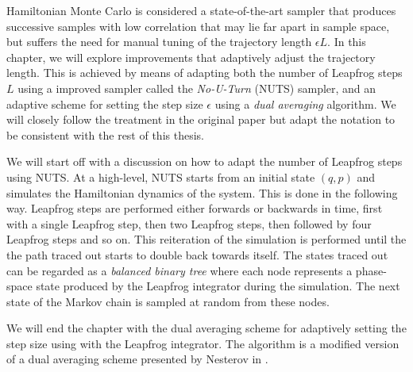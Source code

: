 Hamiltonian Monte Carlo is considered a state-of-the-art sampler that produces successive samples with low correlation
that may lie far apart in sample space, 
but suffers the need for manual tuning of the trajectory length $\epsilon L$. 
In this chapter, we will explore improvements that adaptively adjust the trajectory length. This is achieved by means of adapting both the number of Leapfrog steps $L$ using a improved sampler called the \textit{No-U-Turn} (NUTS) sampler, and an adaptive scheme for setting the step size $\epsilon$ using a \textit{dual averaging} algorithm. We will closely follow the treatment in the original paper \cite{nuts} but adapt the notation to be consistent with the rest of this thesis.

We will start off with a discussion on how to adapt the number of Leapfrog steps using NUTS. At a high-level, NUTS starts from an initial state $(q, p)$ and simulates the Hamiltonian dynamics of the system. This is
done in the following way. Leapfrog steps are performed either forwards or backwards in time, first with a single Leapfrog step, then two Leapfrog steps, then followed by four Leapfrog steps and so on. This reiteration of the simulation is performed until the the path traced out starts to double back towards itself. The states traced out can be regarded as a \textit{balanced binary tree} where
each node represents a phase-space state produced by the Leapfrog integrator during the simulation. The next state of the Markov chain is sampled at random from these nodes.  

We will end the chapter with the dual averaging scheme for adaptively setting the step size using with the Leapfrog integrator. The algorithm is a modified version of a dual averaging scheme presented by Nesterov in \cite{Nesterov2009}.




